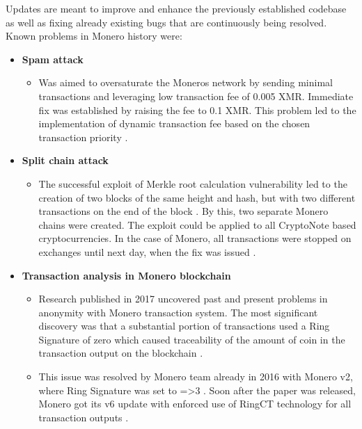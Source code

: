 \documentclass[
  printed, %
  table,   %
  lof,     %
  lot,     %
           oneside, color
]{fithesis3}
\begin{document}
Updates are meant to improve and enhance the previously established codebase as well as fixing already existing bugs that are continuously being resolved. Known problems in Monero history were:

\begin{itemize}
\item \textbf{Spam attack}
\begin{itemize}
\item Was aimed to oversaturate the Moneros network by sending minimal transactions and leveraging low transaction fee of 0.005 XMR. Immediate fix was established by raising the fee to 0.1 XMR. This problem led to the implementation of dynamic transaction fee based on the chosen transaction priority \cite{monerospamattack}.
\end{itemize}
\item \textbf{Split chain attack}
\begin{itemize}
\item The successful exploit of Merkle root calculation vulnerability led to the creation of two blocks of the same height and hash, but with two different transactions on the end of the block \cite{macheta2014counterfeiting}. By this, two separate Monero chains were created. The exploit could be applied to all CryptoNote based cryptocurrencies. In the case of Monero, all transactions were stopped on exchanges until next day, when the fix was issued \cite{cryptonotemerkletree}.
\end{itemize}
\item \textbf{Transaction analysis in Monero blockchain}
\begin{itemize}
\item Research published in 2017 uncovered past and present problems in anonymity with Monero transaction system. The most significant discovery was that a substantial portion of transactions used a Ring Signature of zero which caused traceability of the amount of coin in the transaction output on the blockchain \cite{moser2018empirical}.
\item This issue was resolved by Monero team already in 2016 with Monero v2, where Ring Signature was set to =>3 \cite{monerov2release}. Soon after the paper was released, Monero got its v6 update with enforced use of RingCT technology for all transaction outputs \cite{monerov6release}.
\end{itemize}
\end{itemize}
\newpage
\end{document}
